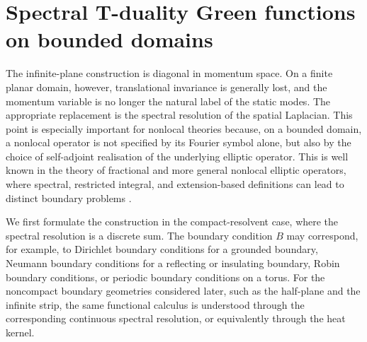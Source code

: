 \documentclass[nopacs,amsmath,amsfonts,amssymb,aps,superscriptaddress]{revtex4}
\begin{document}
\section{Spectral T-duality Green functions on bounded domains}
\label{sec:spectral_bounded_domains}

The infinite-plane construction is diagonal in momentum space. On a finite planar domain, however, translational invariance is generally lost, and the momentum variable is no longer the natural label of the static modes. The appropriate replacement is the spectral resolution of the spatial Laplacian. This point is especially important for nonlocal theories because, on a bounded domain, a nonlocal operator is not specified by its Fourier symbol alone, but also by the choice of self-adjoint realisation of the underlying elliptic operator. This is well known in the theory of fractional and more general nonlocal elliptic operators, where spectral, restricted integral, and extension-based definitions can lead to distinct boundary problems \cite{Seeley1967, Grubb2015, Kwasnicki2017, BonitoPasciak2015}.

We first formulate the construction in the compact-resolvent case, where the spectral resolution is a discrete sum. The boundary condition $B$ may correspond, for example, to Dirichlet boundary conditions for a grounded boundary, Neumann boundary conditions for a reflecting or insulating boundary, Robin boundary conditions, or periodic boundary conditions on a torus. For the noncompact boundary geometries considered later, such as the half-plane and the infinite strip, the same functional calculus is understood through the corresponding continuous spectral resolution, or equivalently through the heat kernel.
\end{document}
